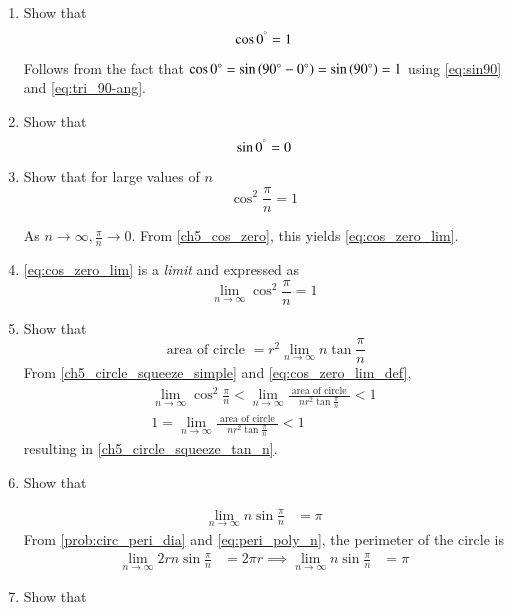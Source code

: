 \begin{enumerate}[label=\arabic*.,ref=\thesubsection.\theenumi]
%
\item
	Show that 
	\begin{equation}
	\label{ch5_cos_zero}
	\cos 0^{\degree} = 1
	\end{equation}

\solution Follows from the fact that $\cos 0 \degree = \sin \left(90\degree -0\degree\right) = \sin \left(90\degree \right)=1$ using \eqref{eq:sin90} and \eqref{eq:tri_90-ang}.



\item
	Show that 
	\begin{equation}
	\label{ch5_sin_zero}
	\sin 0^{\degree} = 0
	\end{equation}

\item
	Show that for large values of $n$
	\begin{equation}
\label{eq:cos_zero_lim}
\cos^2\frac{\pi}{n} = 1
%
	\end{equation}	

%
\solution  As $n \to \infty, \frac{\pi}{n} \to 0$. From \eqref{ch5_cos_zero}, this yields \eqref{eq:cos_zero_lim}.

%
\item  \eqref{eq:cos_zero_lim} is a {\em limit} and 
	 expressed as 
%
\begin{equation}
\label{eq:cos_zero_lim_def}
\lim_{n \rightarrow \infty}\cos^2\frac{\pi}{n} = 1
\end{equation}
%	

\item
	Show that 
\begin{equation}
\label{ch5_circle_squeeze_tan_n}
\text{ area of circle } = r^2\lim_{n \rightarrow \infty}
{n\tan\frac{\pi}{n}} 
\end{equation}	
\solution From \eqref{ch5_circle_squeeze_simple} and \eqref{eq:cos_zero_lim_def}, 
	\begin{align}
\lim_{n\to \infty}\cos^2\frac{\pi}{n} < \lim_{n\to \infty} \frac{\text{ area of circle }}{nr^{2}\tan\frac{\pi}{n}} < 1	
\\
1 = \lim_{n\to \infty} \frac{\text{ area of circle }}{nr^{2}\tan\frac{\pi}{n}} < 1	
\end{align}
resulting in \eqref{ch5_circle_squeeze_tan_n}.
%
\item Show that 

	\begin{align}
\label{eq:peri_poly_sin_n}
 \lim_{n\to \infty}n \sin\frac{\pi}{n} &= \pi 
\end{align}
%
\solution From \eqref{prob:circ_peri_dia} and \eqref{eq:peri_poly_n}, the perimeter of the circle is 
%
\begin{align}
\lim_{n\to \infty}2rn \sin\frac{\pi}{n} &= 2\pi r
\implies \lim_{n\to \infty}n \sin\frac{\pi}{n} &= \pi 
\end{align} 
\item Show that 


\end{enumerate}
